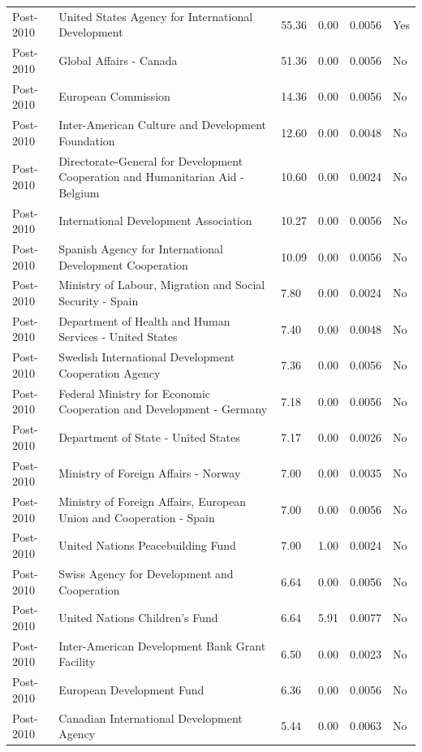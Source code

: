 \begin{table}[!ht]
\begin{tabular}{llllll}
Post-2010 & United States Agency for International Development & 55.36 & 0.00 & 0.0056 & Yes\\
Post-2010 & Global Affairs - Canada & 51.36 & 0.00 & 0.0056 & No\\
Post-2010 & European Commission & 14.36 & 0.00 & 0.0056 & No\\
Post-2010 & Inter-American Culture and Development Foundation & 12.60 & 0.00 & 0.0048 & No\\
Post-2010 & Directorate-General for Development Cooperation and Humanitarian Aid - Belgium & 10.60 & 0.00 & 0.0024 & No\\
Post-2010 & International Development Association & 10.27 & 0.00 & 0.0056 & No\\
Post-2010 & Spanish Agency for International Development Cooperation & 10.09 & 0.00 & 0.0056 & No\\
Post-2010 & Ministry of Labour, Migration and Social Security - Spain & 7.80 & 0.00 & 0.0024 & No\\
Post-2010 & Department of Health and Human Services - United States & 7.40 & 0.00 & 0.0048 & No\\
Post-2010 & Swedish International Development Cooperation Agency & 7.36 & 0.00 & 0.0056 & No\\
Post-2010 & Federal Ministry for Economic Cooperation and Development - Germany & 7.18 & 0.00 & 0.0056 & No\\
Post-2010 & Department of State - United States & 7.17 & 0.00 & 0.0026 & No\\
Post-2010 & Ministry of Foreign Affairs - Norway & 7.00 & 0.00 & 0.0035 & No\\
Post-2010 & Ministry of Foreign Affairs, European Union and Cooperation - Spain & 7.00 & 0.00 & 0.0056 & No\\
Post-2010 & United Nations Peacebuilding Fund & 7.00 & 1.00 & 0.0024 & No\\
Post-2010 & Swiss Agency for Development and Cooperation & 6.64 & 0.00 & 0.0056 & No\\
Post-2010 & United Nations Children's Fund & 6.64 & 5.91 & 0.0077 & No\\
Post-2010 & Inter-American Development Bank Grant Facility & 6.50 & 0.00 & 0.0023 & No\\
Post-2010 & European Development Fund & 6.36 & 0.00 & 0.0056 & No\\
Post-2010 & Canadian International Development Agency & 5.44 & 0.00 & 0.0063 & No\\
\bottomrule
\end{tabular}
\end{table}
